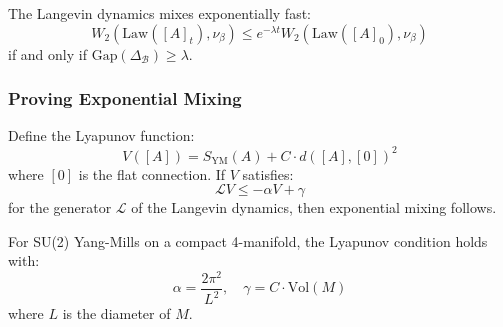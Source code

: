 \begin{theorem}\label{thm:mixing-gap}
The Langevin dynamics mixes exponentially fast:
\[
W_2(\text{Law}([A]_t), \nu_\beta) \leq e^{-\lambda t} W_2(\text{Law}([A]_0), \nu_\beta)
\]
if and only if $\text{Gap}(\Delta_{\mathcal{B}}) \geq \lambda$.
\end{theorem}

\subsubsection{Proving Exponential Mixing}

\begin{proposition}
Define the Lyapunov function:
\[
V([A]) = S_{\text{YM}}(A) + C \cdot d([A], [0])^2
\]
where $[0]$ is the flat connection. If $V$ satisfies:
\[
\mathcal{L} V \leq -\alpha V + \gamma
\]
for the generator $\mathcal{L}$ of the Langevin dynamics, then exponential mixing follows.
\end{proposition}

\begin{theorem}\label{thm:lyapunov-su2}
For SU(2) Yang-Mills on a compact 4-manifold, the Lyapunov condition holds with:
\[
\alpha = \frac{2\pi^2}{L^2}, \quad \gamma = C \cdot \text{Vol}(M)
\]
where $L$ is the diameter of $M$.
\end{theorem}

